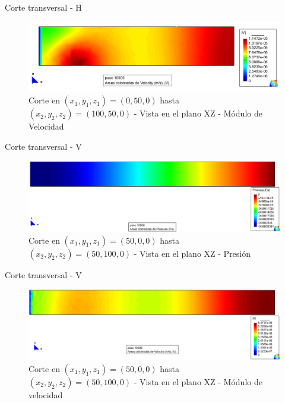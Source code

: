 \documentclass[spanish]{beamer}
\begin{document}
\begin{frame}{Corte transversal - H}
\begin{center}
\begin{figure}[htbp]
\centerline{\includegraphics[scale=0.3]{../img/100m/resul/100_XZ_velocidad_corte_horizontal}}
\caption{Corte en $(x_1,y_1,z_1)=(0,50,0)$ hasta $(x_2,y_2,z_2)=(100,50,0)$ - Vista en el plano XZ - Módulo de Velocidad}
\end{figure}
\end{center}
\end{frame}
%
\begin{frame}{Corte transversal - V}
\begin{center}
\begin{figure}[htbp]
\centerline{\includegraphics[scale=0.3]{../img/200m/resul/200_XZ_presion_corte_horizontal}}
\caption{Corte en $(x_1,y_1,z_1)=(50,0,0)$ hasta $(x_2,y_2,z_2)=(50,100,0)$ - Vista en el plano XZ - Presión}
\end{figure}
\end{center}
\end{frame}
%
\begin{frame}{Corte transversal - V}
\begin{center}
\begin{figure}[htbp]
\centerline{\includegraphics[scale=0.3]{../img/200m/resul/200_XZ_velocidad_corte_horizontal}}
\caption{Corte en $(x_1,y_1,z_1)=(50,0,0)$ hasta $(x_2,y_2,z_2)=(50,100,0)$ - Vista en el plano XZ - Módulo de velocidad}
\end{figure}
\end{center}
\end{frame}
\end{document}
